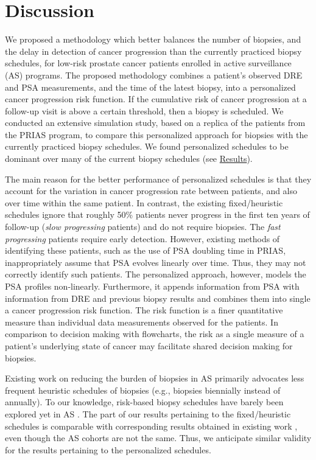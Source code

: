 \section{Discussion}
\label{sec:discussion}
We proposed a methodology which better balances the number of biopsies, and the delay in detection of cancer progression than the currently practiced biopsy schedules, for low-risk prostate cancer patients enrolled in active surveillance (AS) programs. The proposed methodology combines a patient's observed DRE and PSA measurements, and the time of the latest biopsy, into a personalized cancer progression risk function. If the cumulative risk of cancer progression at a follow-up visit is above a certain threshold, then a biopsy is scheduled. We conducted an extensive simulation study, based on a replica of the patients from the PRIAS program, to compare this personalized approach for biopsies with the currently practiced biopsy schedules. We found personalized schedules to be dominant over many of the current biopsy schedules (see \hyperref[sec:results]{Results}).

The main reason for the better performance of personalized schedules is that they account for the variation in cancer progression rate between patients, and also over time within the same patient. In contrast, the existing fixed/heuristic schedules ignore that roughly 50\% patients never progress in the first ten years of follow-up (\textit{slow progressing} patients) and do not require biopsies. The \textit{fast progressing} patients require early detection. However, existing methods of identifying these patients, such as the use of PSA doubling time in PRIAS, inappropriately assume that PSA evolves linearly over time. Thus, they may not correctly identify such patients. The personalized approach, however, models the PSA profiles non-linearly. Furthermore, it appends information from PSA with information from DRE and previous biopsy results and combines them into single a cancer progression risk function. The risk function is a finer quantitative measure than individual data measurements observed for the patients. In comparison to decision making with flowcharts, the risk as a single measure of a patient's underlying state of cancer may facilitate shared decision making for biopsies.

Existing work on reducing the burden of biopsies in AS primarily advocates less frequent heuristic schedules of biopsies \citep{inoue2018comparative} (e.g., biopsies biennially instead of annually). To our knowledge, risk-based biopsy schedules have barely been explored yet in AS \cite{nieboer2018active,bruinsma2016active}. The part of our results pertaining to the fixed/heuristic schedules is comparable with corresponding results obtained in existing work \cite{inoue2018comparative}, even though the AS cohorts are not the same. Thus, we anticipate similar validity for the results pertaining to the personalized schedules.

